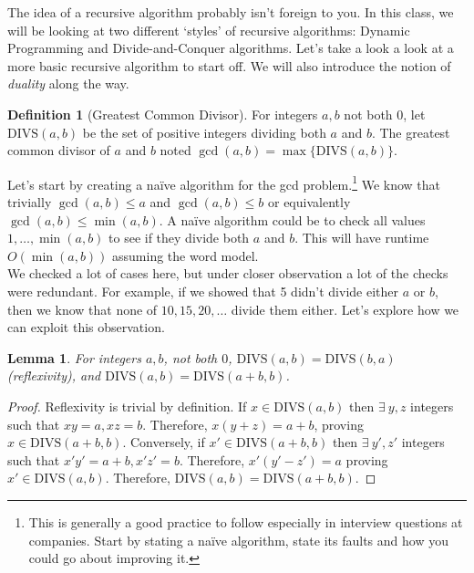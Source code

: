 \documentclass[11pt]{article}
\theoremstyle{plain}
\newtheorem{lem}[thm]{Lemma}
\theoremstyle{definition}
\newtheorem{defn}[thm]{Definition} %
\numberwithin{equation}{section}
\numberwithin{figure}{section}
\begin{document}
\noindent The idea of a recursive algorithm probably isn't foreign to you. In this class, we will be looking at two different `styles' of recursive algorithms: Dynamic Programming and Divide-and-Conquer algorithms. Let's take a look a look at a more basic recursive algorithm to start off. We will also introduce the notion of \emph{duality} along the way.

\begin{defn}[Greatest Common Divisor]
For integers $a, b$ not both $0$, let $\mathrm{DIVS}(a,b)$ be the set of positive integers dividing both $a$ and $b$. The greatest common divisor of $a$ and $b$ noted $\gcd(a,b) = \max \{\mathrm{DIVS}(a,b)\}$. 
\end{defn}

\noindent Let's start by creating a na\"ive algorithm for the gcd problem.\footnote{This is generally a good practice to follow especially in interview questions at companies. Start by stating a na\"ive algorithm, state its faults and how you could go about improving it.} We know that trivially $\gcd(a,b) \leq a$ and $\gcd(a,b) \leq b$ or equivalently $\gcd(a,b) \leq \min(a,b)$. A na\"ive algorithm could be to check all values $1, \ldots, \min(a,b)$ to see if they divide both $a$ and $b$. This will have runtime $O(\min(a,b))$ assuming the word model. \\

\noindent We checked a lot of cases here, but under closer observation a lot of the checks were redundant. For example, if we showed that 5 didn't divide either $a$ or $b$, then we know that none of $10, 15, 20, \ldots$ divide them either. Let's explore how we can exploit this observation.

\begin{lem}
For integers $a, b$, not both $0$, $\mathrm{DIVS}(a,b) = \mathrm{DIVS}(b,a)$ (reflexivity), and $\mathrm{DIVS}(a,b) = \mathrm{DIVS}(a+b,b)$.
\end{lem}

\begin{proof}
Reflexivity is trivial by definition. If $x \in \mathrm{DIVS}(a,b)$ then $\exists \ y, z$ integers such that $xy = a, xz = b$. Therefore, $x(y + z) = a + b$, proving $x \in \mathrm{DIVS}(a+b,b)$. Conversely, if $x' \in \mathrm{DIVS}(a+b,b)$ then $\exists \ y', z'$ integers such that $x' y' = a + b, x' z' = b$. Therefore, $x' (y ' - z') = a$ proving $x' \in \mathrm{DIVS}(a,b)$. Therefore, $\mathrm{DIVS}(a,b) = \mathrm{DIVS}(a+b,b)$.
\end{proof}
\end{document}
